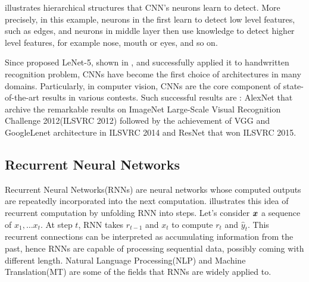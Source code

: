 \addfigure{\ref{fig:conv_intuition}} illustrates hierarchical structures that CNN's neurons learn to detect. More precisely, in this example, neurons in the first learn to detect low level features, such as edges, and neurons in middle layer then use knowledge to detect higher level features, for example nose, mouth or eyes, and so on.


Since \cite{LeCunGradientBasedLearningApplied2001} proposed LeNet-5, shown in \addfigure{\ref{fig:lenet}}, and successfully applied it to handwritten recognition problem, CNNs have become the first choice of architectures in many domains. Particularly, in computer vision, CNNs are the core component of state-of-the-art results in various contests. Such successful results are :  AlexNet\cite{KrizhevskyImageNetClassificationDeep2012} that archive the remarkable results on  ImageNet Large-Scale Visual Recognition Challenge 2012(ILSVRC 2012) followed by the achievement of VGG\cite{SimonyanVeryDeepConvolutional2014} and GoogleLenet \cite{SzegedyGoingDeeperConvolutions2014} architecture in ILSVRC 2014 and ResNet\cite{HeDeepResidualLearning2015} that won ILSVRC 2015.



\subsection{Recurrent Neural Networks}
Recurrent Neural Networks(RNNs) are neural networks whose computed outputs   are repeatedly incorporated into the next computation. \addfigure{\ref{fig:rnn_unfold}} illustrates this idea of recurrent computation by unfolding RNN into steps. Let's consider $\boldsymbol{x}$ a sequence of $x_1, \dots x_t$.  At step $t$, RNN takes $r_{t-1}$ and $x_{t}$ to compute $r_{t}$ and $\hat{y}_t$. This recurrent connections can be interpreted as accumulating information from the past, hence RNNs are capable of processing sequential data, possibly  coming with different length. Natural Language Processing(NLP) and Machine Translation(MT) are some of the fields that RNNs are widely applied to.

